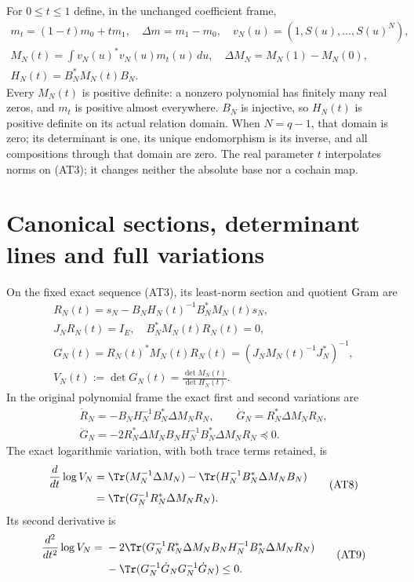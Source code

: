 \documentclass[11pt,a4paper]{article}
\begin{document}
For $0\le t\le1$ define, in the unchanged coefficient frame,
\[
 \begin{gathered}
 m_t=(1-t)m_0+tm_1,\quad \Delta m=m_1-m_0,
 \quad v_N(u)=(1,S(u),\ldots,S(u)^N),\\
 M_N(t)=\int v_N(u)^*v_N(u)m_t(u)\,du,
 \quad \Delta M_N=M_N(1)-M_N(0),\\
 H_N(t)=B_N^*M_N(t)B_N.                     \end{gathered}
 \tag{AT5}
\]
Every $M_N(t)$ is positive definite: a nonzero polynomial has finitely
many real zeros, and $m_t$ is positive almost everywhere. $B_N$ is
injective, so $H_N(t)$ is positive definite on its actual relation
domain. When $N=q-1$, that domain is zero; its determinant is one,
its unique endomorphism is its inverse, and all compositions through
that domain are zero. The real parameter $t$ interpolates norms on
(AT3); it changes neither the absolute base nor a cochain map.

\section{Canonical sections, determinant lines and full variations}

\begin{theorem}
On the fixed exact sequence (AT3), its least-norm section and quotient
Gram are
\[
 \begin{gathered}
 R_N(t)=s_N-B_NH_N(t)^{-1}B_N^*M_N(t)s_N,\\
 J_NR_N(t)=I_E,\quad B_N^*M_N(t)R_N(t)=0,\\
 G_N(t)=R_N(t)^*M_N(t)R_N(t)
       =(J_NM_N(t)^{-1}J_N^*)^{-1},\\
 V_N(t):=\det G_N(t)=\frac{\det M_N(t)}{\det H_N(t)}.
                                                        \end{gathered}
 \tag{AT6}
\]
In the original polynomial frame the exact first and second variations
are
\[
 \begin{gathered}
 \dot R_N=-B_NH_N^{-1}B_N^*\Delta M_NR_N,\qquad
 \dot G_N=R_N^*\Delta M_NR_N,\\
 \ddot G_N=-2R_N^*\Delta M_NB_NH_N^{-1}B_N^*\Delta M_NR_N
            \preceq0.                                \end{gathered}
 \tag{AT7}
\]
The exact logarithmic variation, with both trace terms retained, is
\[
 \begin{split}
 \frac{d}{dt}\log V_N
 &=\Tr(M_N^{-1}\Delta M_N)
   -\Tr(H_N^{-1}B_N^*\Delta M_NB_N)\\
 &=\Tr(G_N^{-1}R_N^*\Delta M_NR_N).             \end{split}
 \tag{AT8}
\]
Its second derivative is
\[
 \begin{split}
 \frac{d^2}{dt^2}\log V_N
 ={}&-2\Tr(G_N^{-1}R_N^*\Delta M_NB_NH_N^{-1}
                         B_N^*\Delta M_NR_N)\\
    &-\Tr(G_N^{-1}\dot G_NG_N^{-1}\dot G_N)\le0.
                                                        \end{split}
 \tag{AT9}
\]
\end{theorem}
\end{document}
